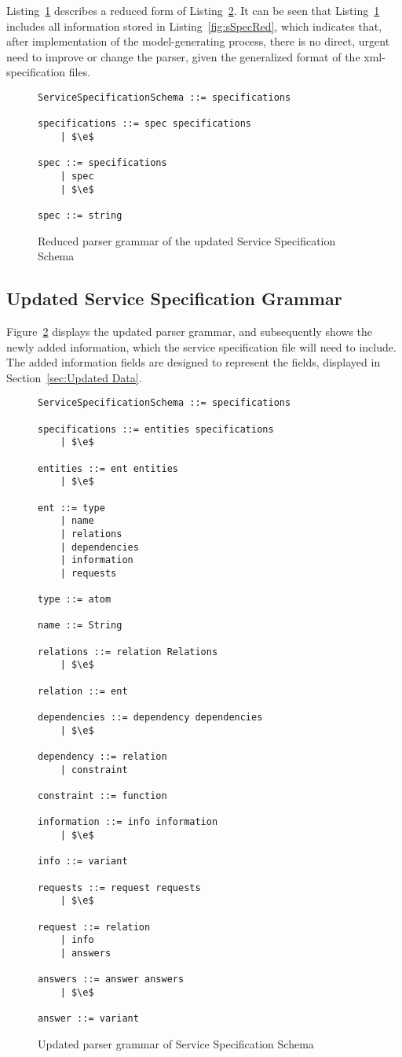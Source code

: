 Listing~\ref{fig:sSpecUpdRed} describes a reduced form of Listing~\ref{fig:sSpecUpd}. It can be seen that Listing~\ref{fig:sSpecUpdRed} includes all information stored in Listing~\ref{fig:sSpecRed}, which indicates that, after implementation of the model-generating process, there is no direct, urgent need to improve or change the parser, given the generalized format of the xml-specification files.

\begin{figure}[h]
  \centering
  \begin{lstlisting}[keywordstyle={}]
ServiceSpecificationSchema ::= specifications

specifications ::= spec specifications
    | $\e$
     
spec ::= specifications
    | spec
    | $\e$

spec ::= string
  \end{lstlisting}
  \caption{Reduced parser grammar of the updated Service Specification Schema}
  \label{fig:sSpecUpdRed}
\end{figure}

\subsection{Updated Service Specification Grammar}

Figure~\ref{fig:sSpecUpd} displays the updated parser grammar, and subsequently shows the newly added information, which the service specification file will need to include. The added information fields are designed to represent the fields, displayed in Section~\ref{sec:Updated Data}.

\begin{figure}
  \centering
  \begin{lstlisting}[keywordstyle={}]
ServiceSpecificationSchema ::= specifications

specifications ::= entities specifications
    | $\e$
     
entities ::= ent entities
    | $\e$

ent ::= type
    | name
    | relations
    | dependencies
    | information
    | requests

type ::= atom

name ::= String

relations ::= relation Relations
    | $\e$

relation ::= ent

dependencies ::= dependency dependencies
    | $\e$

dependency ::= relation
    | constraint

constraint ::= function

information ::= info information
    | $\e$

info ::= variant

requests ::= request requests
    | $\e$

request ::= relation
    | info
    | answers

answers ::= answer answers
    | $\e$

answer ::= variant
  \end{lstlisting}
  \caption{Updated parser grammar of Service Specification Schema}
  \label{fig:sSpecUpd}
\end{figure}
\newpage
